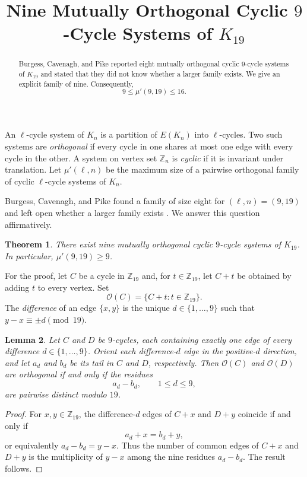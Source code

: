 \documentclass[11pt]{amsart}
\title{Nine Mutually Orthogonal Cyclic $9$-Cycle Systems of $K_{19}$}
\date{}
\newtheorem{theorem}{Theorem}
\newtheorem{lemma}[theorem]{Lemma}
\newcommand{\Z}{\mathbb Z}
\begin{document}
\begin{abstract}
Burgess, Cavenagh, and Pike reported eight mutually orthogonal cyclic
$9$-cycle systems of $K_{19}$ and stated that they did not know whether a
larger family exists. We give an explicit family of nine. Consequently,
\[
9\leq \mu'(9,19)\leq 16.
\]
\end{abstract}

\maketitle

An $\ell$-cycle system of $K_n$ is a partition of $E(K_n)$ into
$\ell$-cycles. Two such systems are \emph{orthogonal} if every cycle in one
shares at most one edge with every cycle in the other. A system on vertex
set $\Z_n$ is \emph{cyclic} if it is invariant under translation. Let
$\mu'(\ell,n)$ be the maximum size of a pairwise orthogonal family of cyclic
$\ell$-cycle systems of $K_n$.

Burgess, Cavenagh, and Pike found a family of size eight for
$(\ell,n)=(9,19)$ and left open whether a larger family exists
\cite[Appendix, Table~1]{BCP}. We answer this question affirmatively.

\begin{theorem}\label{thm:main}
There exist nine mutually orthogonal cyclic $9$-cycle systems of $K_{19}$.
In particular, $\mu'(9,19)\geq 9$.
\end{theorem}

For the proof, let $C$ be a cycle in $\Z_{19}$ and, for $t\in\Z_{19}$, let
$C+t$ be obtained by adding $t$ to every vertex. Set
\[
\mathcal O(C)=\{C+t:t\in\Z_{19}\}.
\]
The \emph{difference} of an edge $\{x,y\}$ is the unique
$d\in\{1,\ldots,9\}$ such that $y-x\equiv\pm d\pmod{19}$.

\begin{lemma}\label{lem:criterion}
Let $C$ and $D$ be $9$-cycles, each containing exactly one edge of every
difference $d\in\{1,\ldots,9\}$. Orient each difference-$d$ edge in the
positive-$d$ direction, and let $a_d$ and $b_d$ be its tail in $C$ and $D$,
respectively. Then $\mathcal O(C)$ and $\mathcal O(D)$ are orthogonal if and
only if the residues
\[
a_d-b_d,\qquad 1\leq d\leq 9,
\]
are pairwise distinct modulo $19$.
\end{lemma}

\begin{proof}
For $x,y\in\Z_{19}$, the difference-$d$ edges of $C+x$ and $D+y$ coincide
if and only if
\[
a_d+x=b_d+y,
\]
or equivalently $a_d-b_d=y-x$. Thus the number of common edges of $C+x$
and $D+y$ is the multiplicity of $y-x$ among the nine residues
$a_d-b_d$. The result follows.
\end{proof}
\end{document}
